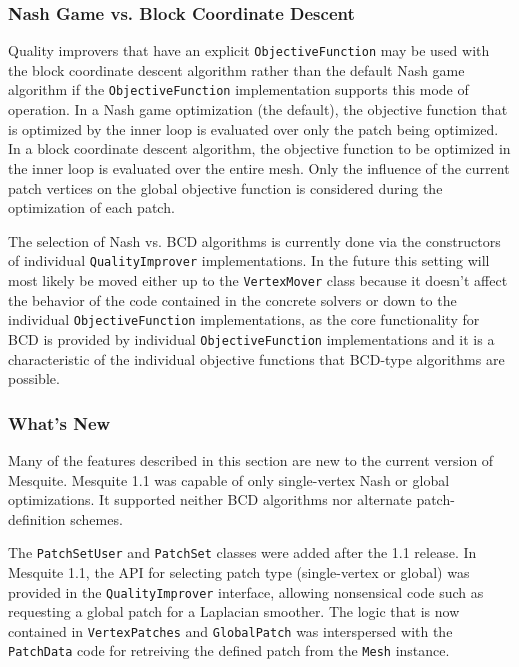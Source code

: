 \documentclass{article}
\begin{document}
\subsubsection{Nash Game vs. Block Coordinate Descent}

Quality improvers that have an explicit \texttt{ObjectiveFunction} may be used with the block coordinate descent algorithm rather than the default Nash game algorithm if the \texttt{ObjectiveFunction} implementation supports this mode of operation. In a Nash game optimization (the default), the objective function that is optimized by the inner loop is evaluated over only the patch being optimized.  In a block coordinate descent algorithm, the objective function to be optimized in the inner loop is evaluated over the entire mesh.  Only the influence of the current patch vertices on the global objective function is considered during the optimization of each patch.

The selection of Nash vs. BCD algorithms is currently done via the constructors of individual \texttt{QualityImprover} implementations.  In the future this setting will most likely be moved either up to the \texttt{VertexMover} class because it doesn't affect the behavior of the code contained in the concrete solvers or down to the individual \texttt{ObjectiveFunction} implementations, as the core functionality for BCD is provided by individual \texttt{ObjectiveFunction} implementations and it is a characteristic of the individual objective functions that BCD-type algorithms are possible.

\subsubsection{What's New}

Many of the features described in this section are new to the current version of Mesquite.  Mesquite 1.1 was capable of only single-vertex Nash or global optimizations.  It supported neither BCD algorithms nor alternate patch-definition schemes.  

The \texttt{PatchSetUser} and \texttt{PatchSet} classes were added after the 1.1 release.  In Mesquite 1.1, the API for selecting patch type (single-vertex or global) was provided in the \texttt{QualityImprover} interface, allowing nonsensical code such as requesting a global patch for a Laplacian smoother.  The logic that is now contained in \texttt{VertexPatches} and \texttt{GlobalPatch} was interspersed with the \texttt{PatchData} code for retreiving the defined patch from the \texttt{Mesh} instance.
\end{document}
